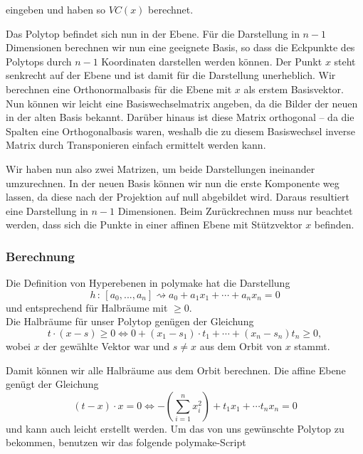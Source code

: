          eingeben und haben so $VC(x)$ berechnet. 
         
         \noindent Das Polytop befindet sich nun in der Ebene. Für die Darstellung in $n-1$ Dimensionen berechnen wir nun eine geeignete Basis, so dass die Eckpunkte des Polytops durch $n-1$ Koordinaten darstellen werden können. 
         Der Punkt $x$ steht senkrecht auf der Ebene und ist damit für die Darstellung 
         unerheblich. Wir berechnen eine Orthonormalbasis für die Ebene mit $x$ als erstem Basisvektor. Nun können wir leicht eine Basiswechselmatrix angeben,
         da die Bilder der neuen in der alten Basis bekannt. Darüber hinaus ist diese Matrix orthogonal -- da die Spalten eine Orthogonalbasis waren, weshalb die zu diesem Basiswechsel inverse Matrix durch Transponieren einfach ermittelt werden kann.

         Wir haben nun also zwei Matrizen, um beide Darstellungen ineinander umzurechnen. In der neuen Basis können wir nun die erste Komponente weg lassen, da diese nach der Projektion auf null abgebildet wird. Daraus resultiert eine Darstellung in $n-1$ Dimensionen.
         Beim Zurückrechnen muss nur beachtet werden, dass sich die Punkte in einer affinen Ebene mit Stützvektor $x$ befinden.

        \subsubsection*{Berechnung}

         Die Definition von Hyperebenen in polymake hat die Darstellung
         $$
            h \, : \, [a_0, ..., a_n] \rightsquigarrow a_0 + a_1 x_1 + \cdots + a_n x_n = 0
         $$
         und entsprechend für Halbräume mit $\geq 0$.\\

         \noindent Die Halbräume für unser Polytop genügen der Gleichung
         $$
            t \cdot (x - s) \geq 0 \Leftrightarrow 0 + (x_1-s_1)\cdot t_1 + \cdots + (x_n -s_n)t_n \geq 0,
         $$
         wobei $x$ der gewählte Vektor war und $s \not= x$ aus dem Orbit von $x$ stammt.

         \noindent Damit können wir alle Halbräume aus dem Orbit berechnen. Die affine Ebene genügt der Gleichung
         $$
            (t - x) \cdot x = 0 \Leftrightarrow - \left( \sum_{i=1}^n x_i^2 \right) + t_1 x_1 + \cdots t_n x_n = 0
         $$
         und kann auch leicht erstellt werden. Um das von uns gewünschte Polytop zu bekommen, benutzen wir das folgende polymake-Script

